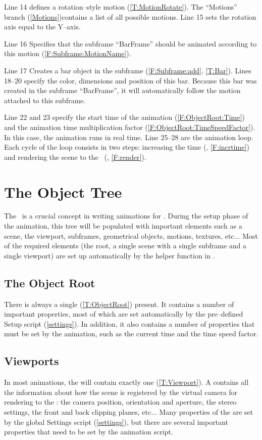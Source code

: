 Line 14 defines a rotation--style motion (\ref{T:MotionRotate}). The ``Motions'' branch (\ref{Motions})contains a list of all possible motions. Line 15 sets the rotation axis equal to the Y--axis.

Line 16 Specifies that the subframe ``BarFrame'' should be animated according to this motion (\ref{F:Subframe:MotionName}).

Line 17 Creates a bar object in the subframe (\ref{F:Subframe:add}, \ref{T:Bar}). Lines 18--20 specify the color, dimensions and position of this bar. Because this bar was created in the subframe ``BarFrame'', it will automatically follow the motion attached to this subframe.

Line 22 and 23 specify the start time of the animation (\ref{F:ObjectRoot:Time}) and the animation time multiplication factor (\ref{F:ObjectRoot:TimeSpeedFactor}). In this case, the animation runs in real time.
Line 25--28 are the animation loop. Each cycle of the loop consists in two steps: increasing the time (, \ref{F:incrtime}) and rendering the scene to the \renderwin\ (, \ref{F:render}).

\section{The Object Tree}
The \objecttree\ is a crucial concept in writing animations for \softwarename. During the setup phase of the animation, this tree will be populated with important elements such as a scene, the viewport, subframes, geometrical objects, motions, textures, etc... Most of the required elements (the root, a single scene with a single subframe and a single viewport) are set up automatically by the helper function  in .

\subsection{The Object Root}
There is always a single  (\ref{T:ObjectRoot}) present. It contains a number of important properties, most of which are set automatically by the pre--defined Setup script (\ref{settings}). In addition, it also contains a number of properties that must be set by the animation, such as the current time and the time speed factor.

\subsection{Viewports}
In most animations, the  will contain exactly one  (\ref{T:Viewport}). A  contains all the information about how the scene is registered by the virtual camera for rendering to the \renderwin: the camera position, orientation and aperture, the stereo settings, the front and back clipping planes, etc... Many properties of the  are set by the global Settings script (\ref{settings}), but there are several important properties that need to be set by the animation script.

